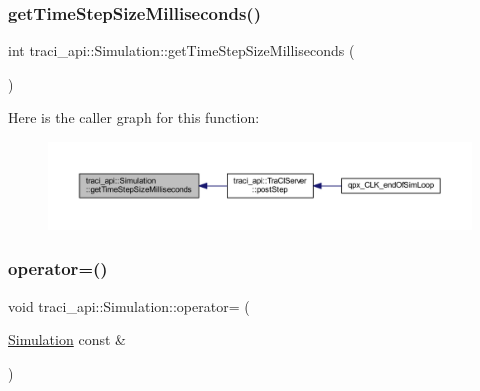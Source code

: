 \mbox{\label{classtraci__api_1_1_simulation_a413eac30f40f25fabbd94cc6ff16a51c}} 
\subsubsection{\texorpdfstring{get\+Time\+Step\+Size\+Milliseconds()}{getTimeStepSizeMilliseconds()}}
{\footnotesize\ttfamily int traci\+\_\+api\+::\+Simulation\+::get\+Time\+Step\+Size\+Milliseconds (\begin{DoxyParamCaption}{ }\end{DoxyParamCaption})}

Here is the caller graph for this function\+:
\nopagebreak
\begin{figure}[H]
\begin{center}
\leavevmode
\includegraphics[width=350pt]{classtraci__api_1_1_simulation_a413eac30f40f25fabbd94cc6ff16a51c_icgraph}
\end{center}
\end{figure}
\mbox{\label{classtraci__api_1_1_simulation_ad51b13fbeca39505efcb2171212ec99d}} 
\subsubsection{\texorpdfstring{operator=()}{operator=()}}
{\footnotesize\ttfamily void traci\+\_\+api\+::\+Simulation\+::operator= (\begin{DoxyParamCaption}\item[{\hyperlink{classtraci__api_1_1_simulation}{Simulation} const \&}]{ }\end{DoxyParamCaption})\hspace{0.3cm}{\ttfamily [delete]}}

